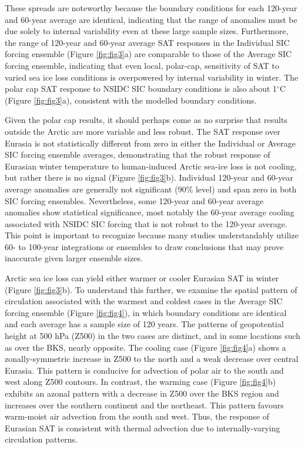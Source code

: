 \documentclass{nature}
\begin{document}
These spreads are noteworthy because the boundary conditions for each 120-year and 60-year average are identical, indicating that the range of anomalies must be due solely to internal variability even at these large sample sizes. Furthermore, the range of 120-year and 60-year average SAT responses in the Individual SIC forcing ensemble (Figure \ref{fig:fig3}a) are comparable to those of the Average SIC forcing ensemble, indicating that even local, polar-cap, sensitivity of SAT to varied sea ice loss conditions is overpowered by internal variability in winter. The polar cap SAT response to NSIDC SIC boundary conditions is also about 1$^\circ$C (Figure \ref{fig:fig3}a), consistent with the modelled boundary conditions.   

Given the polar cap results, it should perhaps come as no surprise that results outside the Arctic are more variable and less robust. The SAT response over Eurasia is not statistically different from zero in either the Individual or Average SIC forcing ensemble averages, demonstrating that the robust response of Eurasian winter temperature to human-induced Arctic sea-ice loss is not cooling, but rather there is no signal (Figure \ref{fig:fig3}b). Individual 120-year and 60-year average anomalies are generally not significant (90\% level) and span zero in both SIC forcing ensembles. Nevertheless, some 120-year and 60-year average anomalies show statistical significance, most notably the 60-year average cooling associated with NSIDC SIC forcing that is not robust to the 120-year average. This point is important to recognize because many studies understandably utilize 60- to 100-year integrations or ensembles to draw conclusions that may prove inaccurate given larger ensemble sizes.

Arctic sea ice loss can yield either warmer or cooler Eurasian SAT in winter (Figure \ref{fig:fig3}b). To understand this further, we examine the spatial pattern of circulation associated with the warmest and coldest cases in the Average SIC forcing ensemble (Figure \ref{fig:fig4}), in which boundary conditions are identical and each average has a sample size of 120 years. The patterns of geopotential height at 500 hPa (Z500) in the two cases are distinct, and in some locations such as over the BKS, nearly opposite. The cooling case (Figure \ref{fig:fig4}a) shows a zonally-symmetric increase in Z500 to the north and a weak decrease over central Eurasia. This pattern is conducive for advection of polar air to the south and west along Z500 contours. In contrast, the warming case (Figure \ref{fig:fig4}b) exhibits an azonal pattern with a decrease in Z500 over the BKS region and increases over the southern continent and the northeast. This pattern favours warm-moist air advection from the south and west. Thus, the response of Eurasian SAT is consistent with thermal advection due to internally-varying circulation patterns. 
\end{document}
